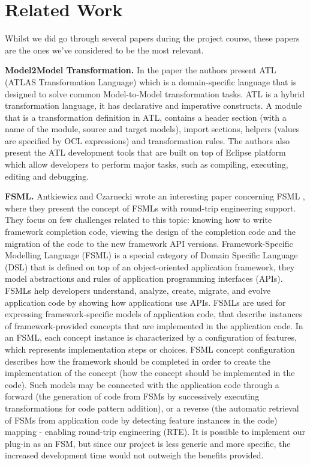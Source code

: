 \section{Related Work}
\label{relatedwork}
Whilst we did go through several papers during the project course, these papers are the ones we've considered to be the most relevant.

\textbf{Model2Model Transformation.} In the paper \cite{atl} the authors present ATL (ATLAS Transformation Language) which is a domain-specific language that is designed to solve common Model-to-Model transformation tasks. ATL is a hybrid transformation language, it has declarative and imperative constructs. A module that is a transformation definition in ATL, contains a header section (with a name of the module, source and target models), import sections, helpers (values are specified by OCL expressions) and transformation rules. The authors also present the ATL development tools that are built on top of Eclipse platform which allow developers to perform major tasks, such as compiling, executing, editing and debugging.


\textbf{FSML.} Antkiewicz and Czarnecki wrote an interesting paper concerning FSML \cite{FSML}, where they present the concept of FSMLs with round-trip engineering support. They focus on few challenges related to this topic: knowing how to write framework completion code, viewing the design of the completion code and the migration of the code to the new framework API versions. Framework-Specific Modelling Language (FSML) is a special category of Domain Specific Language (DSL) that is defined on top of an object-oriented application framework, they model abstractions and rules of application programming interfaces (APIs). FSMLs help developers understand, analyze, create, migrate, and evolve application code by showing how applications use APIs. FSMLs are used for expressing framework-specific models of application code, that describe instances of framework-provided concepts that are implemented in the application code. In an FSML, each concept instance is characterized by a configuration of features, which represents implementation steps or choices. FSML concept configuration describes how the framework should be completed in order to create the implementation of the concept (how the concept should be implemented in the code). Such models may be connected with the application code through a forward (the generation of code from FSMs by successively executing transformations for code pattern addition), or a reverse (the automatic retrieval of FSMs from application code by detecting feature instances in the code) mapping - enabling round-trip engineering (RTE). It is possible to implement our plug-in as an FSM, but since our project is less generic and more specific, the increased development time would not outweigh the benefits provided.
